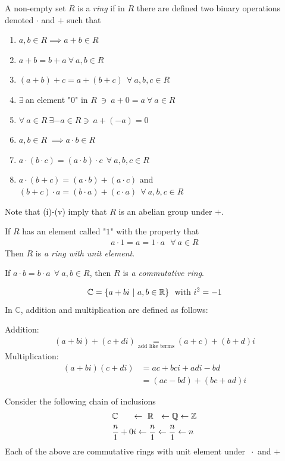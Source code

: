 \begin{definition}[Ring]
A non-empty set $R$ is a \textit{ring} if in $R$ there are defined two binary operations denoted
$\cdot$ and $+$ such that
\begin{enumerate}[label=\roman*)]
    \item $a,b \in R \implies a+b \in R$
    \item $a+b=b+a \ \forall \ a,b \in R$
    \item $(a+b)+c = a+(b+c) \ \ \forall \ a,b,c \in R$
    \item $\exists \ $an element "$0$" in $R \ \ni \ a+0=a \ \forall \ a \in R$
    \item $\forall \ a\in R \ \exists -a\in R \ni \ a+(-a)=0$
    \item $a,b\in R \ \implies a\cdot b \in R$
    \item $a\cdot (b\cdot c) = (a\cdot b)\cdot c \ \ \forall \ a,b,c \in R$
    \item $a\cdot (b+c) = (a\cdot b)+(a\cdot c)$ and
    $(b+c)\cdot a = (b\cdot a)+(c\cdot a) \ \ \forall \ a,b,c\in R$
\end{enumerate}
Note that (i)-(v) imply that $R$ is an abelian group under $+$. \steezybreak

\noindent If $R$ has an element called "$1$" with the property that
\begin{align}
    a\cdot 1 = a = 1\cdot a \ \ \ \forall \ a\in R \nonumber
\end{align}
Then $R$ is \textit{a ring with unit element}. \steezybreak

\noindent If $a\cdot b=b\cdot a \ \ \forall \ a,b\in R$, then $R$ is \textit{a commutative ring}.
\end{definition}
\newpage
\begin{definition}
\begin{align}
    \mathbb{C} = \{a+bi \ |\ a,b\in {\mathbb{R}}\} \ \text{ with } i^2=-1 \nonumber
\end{align}
In $\mathbb{C}$, addition and multiplication are defined as follows:\steezybreak

\noindent Addition:
\begin{align}
    (a+bi)+(c+di) \underset{\text{add like terms}}{=} (a+c)+(b+d)i \nonumber
\end{align}
Multiplication:
\begin{align}
    (a+bi)(c+di)&=ac+bci+adi-bd \nonumber \\
    &= (ac-bd)+(bc+ad)i \nonumber
\end{align}
\end{definition}
Consider the following chain of inclusions
\begin{align}
    &\mathbb{C} \ \ \ \ \ \leftarrow \ {\mathbb{R}} \ \ \leftarrow \mathbb{Q} \leftarrow {\mathbb{Z}}  \nonumber \\
    &\frac{n}{1}+0i \leftarrow \frac{n}{1} \leftarrow \frac{n}{1} \leftarrow n \nonumber
\end{align}
Each of the above are commutative rings with unit element under $\ \cdot$ and $+$ \steezybreak

